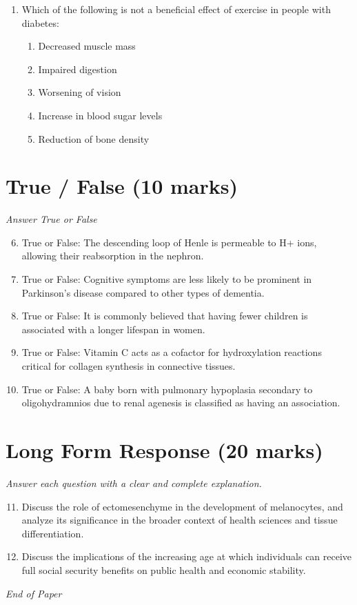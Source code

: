 \documentclass[12pt]{article}
\begin{document}
\begin{enumerate}[label=\arabic*.]
\begin{enumerate}[label=(\alph*)]
    \item 20-30 minutes.
    \item 1-2 seconds.
    \item 10-15 minutes.
    \item 30-40 seconds.
    \item 90-100 seconds.
\end{enumerate}
\item Which of the following is not a beneficial effect of exercise in people with diabetes:
\begin{enumerate}[label=(\alph*)]
    \item Decreased muscle mass
    \item Impaired digestion
    \item Worsening of vision
    \item Increase in blood sugar levels
    \item Reduction of bone density
\end{enumerate}
\end{enumerate}

\section*{True / False (10 marks)}
\textit{Answer True or False}
\begin{enumerate}[label=\arabic*.]
\setcounter{enumi}{5}
\item True or False: The descending loop of Henle is permeable to H+ ions, allowing their reabsorption in the nephron.
\item True or False: Cognitive symptoms are less likely to be prominent in Parkinson's disease compared to other types of dementia.
\item True or False: It is commonly believed that having fewer children is associated with a longer lifespan in women.
\item True or False: Vitamin C acts as a cofactor for hydroxylation reactions critical for collagen synthesis in connective tissues.
\item True or False: A baby born with pulmonary hypoplasia secondary to oligohydramnios due to renal agenesis is classified as having an association.
\end{enumerate}

\section*{Long Form Response (20 marks)}
\textit{Answer each question with a clear and complete explanation.}
\begin{enumerate}[label=\arabic*.]
\setcounter{enumi}{10}
\item Discuss the role of ectomesenchyme in the development of melanocytes, and analyze its significance in the broader context of health sciences and tissue differentiation.
\item Discuss the implications of the increasing age at which individuals can receive full social security benefits on public health and economic stability.
\end{enumerate}

\vfill
\noindent\textit{End of Paper}
\end{document}
